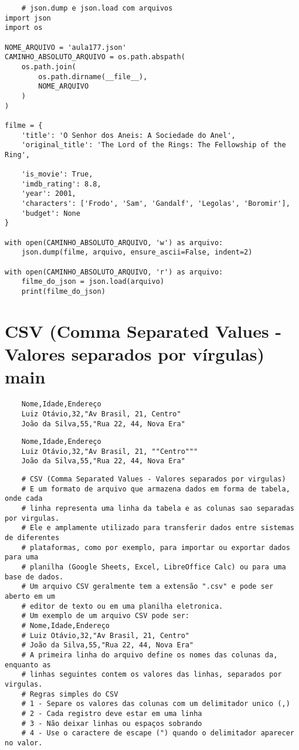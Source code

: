 \documentclass{article}
\begin{document}
\begin{lstlisting}
    # json.dump e json.load com arquivos
import json
import os

NOME_ARQUIVO = 'aula177.json'
CAMINHO_ABSOLUTO_ARQUIVO = os.path.abspath(
    os.path.join(
        os.path.dirname(__file__),
        NOME_ARQUIVO
    )
)

filme = {
    'title': 'O Senhor dos Aneis: A Sociedade do Anel',
    'original_title': 'The Lord of the Rings: The Fellowship of the Ring',

    'is_movie': True,
    'imdb_rating': 8.8,
    'year': 2001,
    'characters': ['Frodo', 'Sam', 'Gandalf', 'Legolas', 'Boromir'],
    'budget': None
}

with open(CAMINHO_ABSOLUTO_ARQUIVO, 'w') as arquivo:
    json.dump(filme, arquivo, ensure_ascii=False, indent=2)

with open(CAMINHO_ABSOLUTO_ARQUIVO, 'r') as arquivo:
    filme_do_json = json.load(arquivo)
    print(filme_do_json)
\end{lstlisting}
\section{CSV (Comma Separated Values - Valores separados por vírgulas)
main}
\begin{lstlisting}
    Nome,Idade,Endereço
    Luiz Otávio,32,"Av Brasil, 21, Centro"
    João da Silva,55,"Rua 22, 44, Nova Era"
\end{lstlisting}
\begin{lstlisting}
    Nome,Idade,Endereço
    Luiz Otávio,32,"Av Brasil, 21, ""Centro"""
    João da Silva,55,"Rua 22, 44, Nova Era"
\end{lstlisting}

\begin{lstlisting}
    # CSV (Comma Separated Values - Valores separados por virgulas)
    # E um formato de arquivo que armazena dados em forma de tabela, onde cada
    # linha representa uma linha da tabela e as colunas sao separadas por virgulas.
    # Ele e amplamente utilizado para transferir dados entre sistemas de diferentes
    # plataformas, como por exemplo, para importar ou exportar dados para uma
    # planilha (Google Sheets, Excel, LibreOffice Calc) ou para uma base de dados.
    # Um arquivo CSV geralmente tem a extensão ".csv" e pode ser aberto em um
    # editor de texto ou em uma planilha eletronica.
    # Um exemplo de um arquivo CSV pode ser:
    # Nome,Idade,Endereço
    # Luiz Otávio,32,"Av Brasil, 21, Centro"
    # João da Silva,55,"Rua 22, 44, Nova Era"
    # A primeira linha do arquivo define os nomes das colunas da, enquanto as
    # linhas seguintes contem os valores das linhas, separados por virgulas.
    # Regras simples do CSV
    # 1 - Separe os valores das colunas com um delimitador unico (,)
    # 2 - Cada registro deve estar em uma linha
    # 3 - Não deixar linhas ou espaços sobrando
    # 4 - Use o caractere de escape (") quando o delimitador aparecer no valor.
\end{lstlisting}
\end{document}
